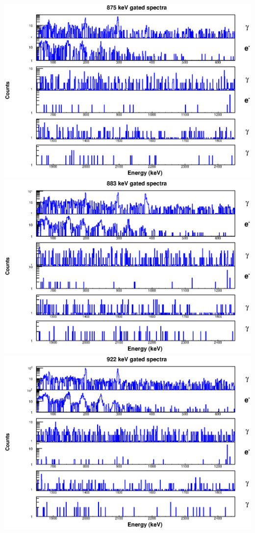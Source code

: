 \begin{landscape}
\includegraphics[scale=1.1]{156Gd_Appendix/875_combined.eps}
\includegraphics[scale=1.1]{156Gd_Appendix/883_combined.eps}
\includegraphics[scale=1.1]{156Gd_Appendix/922_combined.eps}

\end{landscape}
